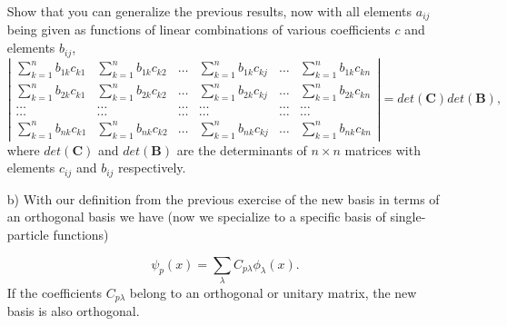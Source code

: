 \documentclass[prc]{revtex4}
\begin{document}
\begin{enumerate}
Show that you can generalize the previous results, now 
with all elements $a_{ij}$  being given as functions of 
linear combinations  of various coefficients $c$ and elements $b_{ij}$,
\[
\left| \begin{array}{cccccc} \sum_{k=1}^n b_{1k}c_{k1}& \sum_{k=1}^n b_{1k}c_{k2} & \dots & \sum_{k=1}^n b_{1k}c_{kj}  &\dots & \sum_{k=1}^n b_{1k}c_{kn}\\
\sum_{k=1}^n b_{2k}c_{k1}& \sum_{k=1}^n b_{2k}c_{k2} & \dots & \sum_{k=1}^n b_{2k}c_{kj} &\dots & \sum_{k=1}^n b_{2k}c_{kn}\\
\dots & \dots & \dots & \dots & \dots & \dots \\
\dots & \dots & \dots & \dots & \dots &\dots \\
\sum_{k=1}^n b_{nk}c_{k1}& \sum_{k=1}^n b_{nk}c_{k2} & \dots & \sum_{k=1}^n b_{nk}c_{kj} &\dots & \sum_{k=1}^n b_{nk}c_{kn}\end{array} \right|=det(\mathbf{C})det(\mathbf{B}),
\]
where $det(\mathbf{C})$ and $det(\mathbf{B})$ are the determinants of $n\times n$ matrices
with elements $c_{ij}$ and $b_{ij}$ respectively.  

\item[b)]
With our definition from the previous exercise of the new basis in terms of an orthogonal basis we have (now we specialize to a specific basis of single-particle functions)  

\[
\psi_p(x)  = \sum_{\lambda} C_{p\lambda}\phi_{\lambda}(x).
\]
If the coefficients $C_{p\lambda}$ belong to an orthogonal or unitary matrix, the new basis is also orthogonal.


\end{enumerate}
\end{document}
